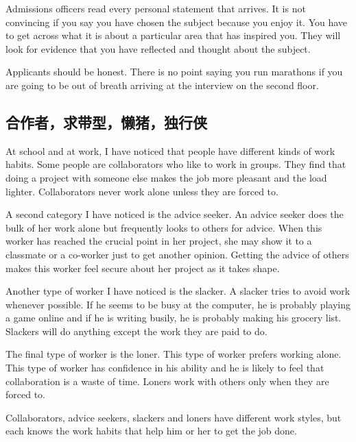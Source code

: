 Admissions officers read every personal statement that
arrives. It is not convincing if you say you have chosen
the subject because you enjoy it. You have to get across
what it is about a particular area that has inspired you.
They will look for evidence that you have reflected and
thought about the subject.

Applicants should be honest. There is no point saying you
run marathons if you are going to be out of breath arriving
at the interview on the second floor.
\subsection{合作者，求带型，懒猪，独行侠}
\begin{margintable}\vspace{-2cm}\footnotesize
\end{margintable}
At school and at work, I have noticed that people have
different kinds of work habits. Some people are collaborators
who like to work in groups. They find that doing a project
with someone else makes the job more pleasant and
the load lighter. Collaborators never work alone
unless they are forced to.

A second category I have noticed is the advice seeker.
An advice seeker does the bulk of her work alone but
frequently looks to others for advice. When this worker has
reached the crucial point in her project, she may show it
to a classmate or a co-worker just to get another opinion.
Getting the advice of others makes this worker feel secure
about her project as it takes shape.

Another type of worker I have noticed is the slacker.
A slacker tries to avoid work whenever possible. If he
seems to be busy at the computer, he is probably playing
a game online and if he is writing busily, he is probably
making his grocery list. Slackers will do anything except
the work they are paid to do.

The final type of worker is the loner. This type of worker
prefers working alone. This type of worker has confidence
in his ability and he is likely to feel that collaboration is a
waste of time. Loners work with others only when
they are forced to.

Collaborators, advice seekers, slackers and loners have
different work styles, but each knows the work habits that
help him or her to get the job done.

